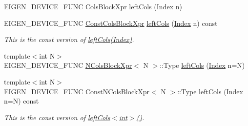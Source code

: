 \begin{DoxyCompactItemize}
E\+I\+G\+E\+N\+\_\+\+D\+E\+V\+I\+C\+E\+\_\+\+F\+U\+NC \mbox{\hyperlink{class_eigen_1_1_block}{Cols\+Block\+Xpr}} \mbox{\hyperlink{class_eigen_1_1_sparse_matrix_base_a9df32a7c2b6276259c05c996aaa929a8}{left\+Cols}} (\mbox{\hyperlink{struct_eigen_1_1_eigen_base_a554f30542cc2316add4b1ea0a492ff02}{Index}} n)
\item 
\mbox{\label{class_eigen_1_1_sparse_matrix_base_a20db2634ddca627daf1586c1f1b51db3}} 
E\+I\+G\+E\+N\+\_\+\+D\+E\+V\+I\+C\+E\+\_\+\+F\+U\+NC \mbox{\hyperlink{class_eigen_1_1_block}{Const\+Cols\+Block\+Xpr}} \mbox{\hyperlink{class_eigen_1_1_sparse_matrix_base_a20db2634ddca627daf1586c1f1b51db3}{left\+Cols}} (\mbox{\hyperlink{struct_eigen_1_1_eigen_base_a554f30542cc2316add4b1ea0a492ff02}{Index}} n) const
\begin{DoxyCompactList}\small\item\em This is the const version of \mbox{\hyperlink{class_eigen_1_1_sparse_matrix_base_a9df32a7c2b6276259c05c996aaa929a8}{left\+Cols(\+Index)}}. \end{DoxyCompactList}\item 
{\footnotesize template$<$int N$>$ }\\E\+I\+G\+E\+N\+\_\+\+D\+E\+V\+I\+C\+E\+\_\+\+F\+U\+NC \mbox{\hyperlink{struct_eigen_1_1_sparse_matrix_base_1_1_n_cols_block_xpr}{N\+Cols\+Block\+Xpr}}$<$ N $>$\+::Type \mbox{\hyperlink{class_eigen_1_1_sparse_matrix_base_a4bff782eeab332b5e1d8210d86755be4}{left\+Cols}} (\mbox{\hyperlink{struct_eigen_1_1_eigen_base_a554f30542cc2316add4b1ea0a492ff02}{Index}} n=N)
\item 
\mbox{\label{class_eigen_1_1_sparse_matrix_base_a9d9195047f341b44ab18dcd418509b41}} 
{\footnotesize template$<$int N$>$ }\\E\+I\+G\+E\+N\+\_\+\+D\+E\+V\+I\+C\+E\+\_\+\+F\+U\+NC \mbox{\hyperlink{struct_eigen_1_1_sparse_matrix_base_1_1_const_n_cols_block_xpr}{Const\+N\+Cols\+Block\+Xpr}}$<$ N $>$\+::Type \mbox{\hyperlink{class_eigen_1_1_sparse_matrix_base_a9d9195047f341b44ab18dcd418509b41}{left\+Cols}} (\mbox{\hyperlink{struct_eigen_1_1_eigen_base_a554f30542cc2316add4b1ea0a492ff02}{Index}} n=N) const
\begin{DoxyCompactList}\small\item\em This is the const version of \mbox{\hyperlink{class_eigen_1_1_sparse_matrix_base_a9df32a7c2b6276259c05c996aaa929a8}{left\+Cols$<$int$>$()}}. \end{DoxyCompactList}\item 

\end{DoxyCompactItemize}
